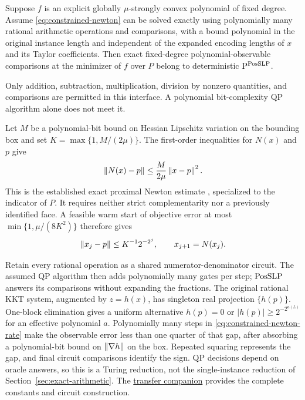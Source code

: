 \begin{theorem}
\label{thm:constrained-newton-transfer}
Suppose $f$ is an explicit globally $\mu$-strongly convex polynomial of
fixed degree. Assume \eqref{eq:constrained-newton} can be solved exactly
using polynomially many rational arithmetic operations and comparisons,
with a bound polynomial in the original instance length and independent
of the expanded encoding lengths of $x$ and its Taylor coefficients.
Then exact fixed-degree polynomial-observable comparisons at the minimizer
of $f$ over $P$ belong to deterministic $\mathrm P^{\mathrm{PosSLP}}$.
\end{theorem}

Only addition, subtraction, multiplication, division by nonzero quantities,
and comparisons are permitted in this interface. A polynomial
bit-complexity QP algorithm alone does not meet it.

Let $M$ be a polynomial-bit bound on Hessian Lipschitz variation on the
bounding box and set $K=\max\{1,M/(2\mu)\}$. The first-order inequalities
for $N(x)$ and $p$ give
\[
 \left\lVert N(x)-p\right\rVert\le\frac{M}{2\mu}\left\lVert x-p\right\rVert^2.
\]
This is the established exact proximal Newton estimate
\citep[Theorem~3.4]{LeeSunSaunders2014}, specialized to the indicator of
$P$. It requires neither strict complementarity nor a previously identified
face. A feasible warm start of objective error at most
$\min\{1,\mu/(8K^2)\}$ therefore gives
\begin{equation}
 \left\lVert x_j-p\right\rVert\le K^{-1}2^{-2^j},\qquad x_{j+1}=N(x_j).
 \label{eq:constrained-newton-rate}
\end{equation}

Retain every rational operation as a shared numerator-denominator circuit.
The assumed QP algorithm then adds polynomially many gates per step;
$\mathrm{PosSLP}$ answers its comparisons without expanding the fractions.
The original rational KKT system, augmented by $z=h(x)$, has singleton
real projection $\{h(p)\}$. One-block elimination gives a uniform
alternative $h(p)=0$ or $|h(p)|\ge2^{-2^{a(L)}}$ for an effective
polynomial $a$. Polynomially many steps in
\eqref{eq:constrained-newton-rate} make the observable error less than one
quarter of that gap, after absorbing a polynomial-bit bound on
$\left\lVert\nabla h\right\rVert$ on the box.
Repeated squaring represents the gap, and final circuit comparisons
identify the sign. QP decisions depend on oracle answers, so this is a
Turing reduction, not the single-instance reduction of
Section~\ref{sec:exact-arithmetic}. The
\href{../constrained-exact/structural-newton.md}{transfer companion}
provides the complete constants and circuit construction.

